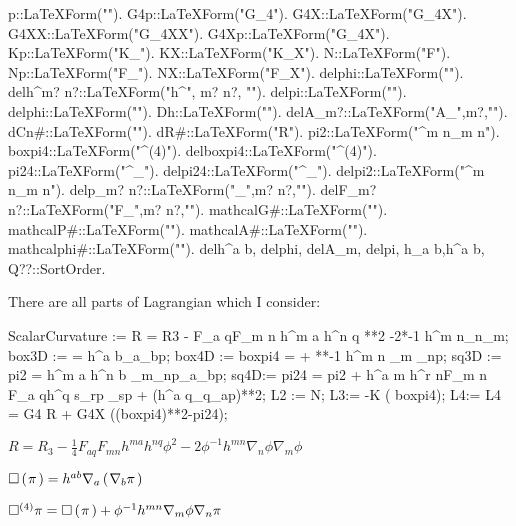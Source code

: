 \documentclass[10pt]{article}
\newcommand\brwrap[3]{%
  \setbox0=\hbox{$#2$}
  \left#1\vbox to \the\ht0{\hbox to 0pt{}}\right.\kern-.2em
  \begingroup #2\endgroup\kern-.15em
  \left.\vbox to \the\ht0{\hbox to 0pt{}}\right#3
}
\begin{document}
\begin{python}
p::LaTeXForm("\pi").
G4p::LaTeXForm("G_{4\pi}").
G4X::LaTeXForm("G_{4X}").
G4XX::LaTeXForm("G_{4XX}").
G4Xp::LaTeXForm("G_{4\pi X}").
Kp::LaTeXForm("K_{\pi}").
KX::LaTeXForm("K_{X}").
N::LaTeXForm("F").
Np::LaTeXForm("F_{\pi}").
NX::LaTeXForm("F_{X}").
delphi::LaTeXForm("\delta\phi").
delh^{m? n?}::LaTeXForm("\delta h^{", m? n?, "}").
delpi::LaTeXForm("\delta\pi").
delphi::LaTeXForm("\delta\phi").
Dh::LaTeXForm("").
delA_{m?}::LaTeXForm("\delta A_{",m?,"}").
dCn{#}::LaTeXForm("\delta\Gamma").         
dR{#}::LaTeXForm("\delta R").	
pi2::LaTeXForm("\pi^{m n}\pi_{m n}").	
boxpi4::LaTeXForm("\Box^{(4)}{\pi}").
delboxpi4::LaTeXForm("\delta\Box^{(4)}{\pi}").
pi24::LaTeXForm("\pi^{\mu \nu}\pi_{\mu \nu}").
delpi24::LaTeXForm("\delta\pi^{\mu \nu}\pi_{\mu \nu}").
delpi2::LaTeXForm("\delta\pi^{m n}\pi_{m n}").
delp_{m? n?}::LaTeXForm("\delta\pi_{",m? n?,"}").
delF_{m? n?}::LaTeXForm("\delta F_{",m? n?,"}").
mathcalG{#}::LaTeXForm("").
mathcalP{#}::LaTeXForm("").
mathcalA{#}::LaTeXForm("").
mathcalphi{#}::LaTeXForm("\Phi").
{delh^{a b}, delphi, delA_{m}, delpi, h_{a b},h^{a b}, Q??}::SortOrder.
\end{python}
There are all parts of Lagrangian which I consider:
\begin{python}
ScalarCurvature := R = R3 -  F_{a q}F_{m n} h^{m a} h^{n q} {\phi}**{2} -2\phi**{-1} h^{m n}\nabla_{n}{\phi}\nabla_{m}{\phi};
box3D :=  = h^{a b}\nabla_{a}{\nabla_{b}{p}};
box4D := boxpi4 =  + {\phi}**{-1} h^{m n} \nabla_{m}{\phi} \nabla_{n}{p};
sq3D := pi2 = h^{m a} h^{n b} \nabla_{m}{\nabla_{n}{p}}\nabla_{a}{\nabla_{b}{p}};
sq4D:=  pi24 = pi2 + h^{a m} h^{r n}F_{m n} F_{a q}h^{q s}\nabla_{r}{p} \nabla_{s}{p}
	 + (h^{a q}\nabla_{q}{\phi}\nabla_{a}{p})**2;
L2 := N;
L3:=  -K ( boxpi4);
L4:= L4 = G4 R + G4X ((boxpi4)**2-pi24);
\end{python}
\begin{adjustwidth}{1em}{0cm}${}R = {R_{3}} - \frac{1}{4}F_{a q} F_{m n} h^{m a} h^{n q} {\phi}^{2}-2{\phi}^{-1} h^{m n} \nabla_{n}{\phi} \nabla_{m}{\phi}$\end{adjustwidth}
\begin{adjustwidth}{1em}{0cm}${}\Box\brwrap{(}{\pi}{)} = h^{a b} \nabla_{a}\brwrap{(}{\nabla_{b}{\pi}}{)}$\end{adjustwidth}
\begin{adjustwidth}{1em}{0cm}${}\Box^{(4)}{\pi} = \Box\brwrap{(}{\pi}{)}+{\phi}^{-1} h^{m n} \nabla_{m}{\phi} \nabla_{n}{\pi}$\end{adjustwidth}
\end{document}
